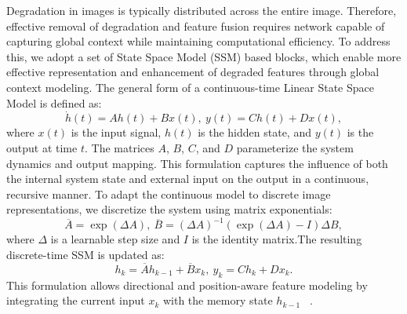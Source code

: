 \documentclass[letterpaper]{article} %
\begin{document}
Degradation in images is typically distributed across the entire image. Therefore, effective removal of degradation and feature fusion requires network capable of capturing global context while maintaining computational efficiency. To address this, we adopt a set of State Space Model (SSM) based blocks, which enable more effective representation and enhancement of degraded features through global context modeling. The general form of a continuous-time Linear State Space Model is defined as:
\begin{equation}
    \dot{h}(t) = A h(t) + B x(t), \
    y(t) = C h(t) + D x(t),
\end{equation}
where $x(t)$ is the input signal, $h(t)$ is the hidden state, and $y(t)$ is the output at time $t$. The matrices $A$, $B$, $C$, and $D$ parameterize the system dynamics and output mapping. This formulation captures the influence of both the internal system state and external input on the output in a continuous, recursive manner. To adapt the continuous model to discrete image representations, we discretize the system using matrix exponentials:
\begin{equation}
    \overline{A} = \exp(\Delta A), \
    \overline{B} = (\Delta A)^{-1} (\exp(\Delta A) - I) \Delta B,
\end{equation}
where $\Delta$ is a learnable step size and $I$ is the identity matrix.The resulting discrete-time SSM is updated as:
\begin{equation}
    h_k = \overline{A} h_{k-1} + \overline{B} x_k, \
    y_k = C h_k + D x_k.
\end{equation}
This formulation allows directional and position-aware feature modeling by integrating the current input $x_k$ with the memory state $h_{k-1}$ ~\cite{guo2024mambair}. 
\end{document}
